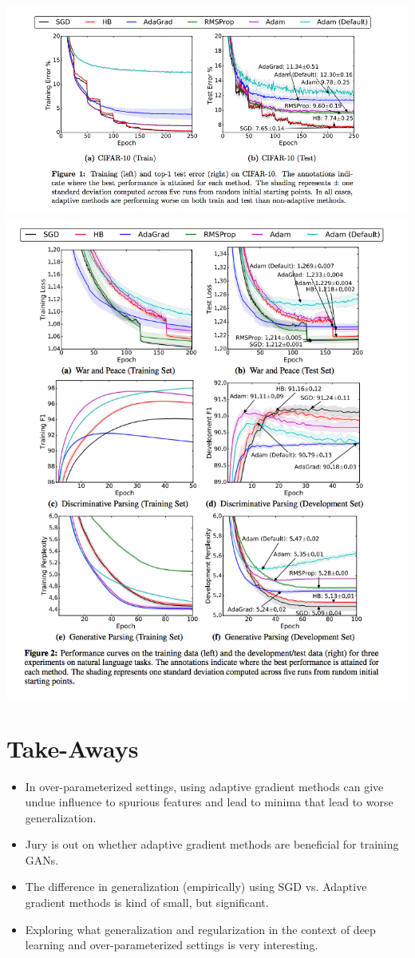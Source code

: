 \documentclass[12pt]{article}
\begin{document}
\includegraphics[width=1\textwidth]{generalization-curves}
\includegraphics[width=1\textwidth]{curves}

\newpage
\section{Take-Aways}

\begin{itemize}
	\item In over-parameterized settings, using adaptive gradient methods can give undue influence to spurious features and lead to minima that lead to worse generalization.
	\item Jury is out on whether adaptive gradient methods are beneficial for training GANs.
	\item The difference in generalization (empirically) using SGD vs. Adaptive gradient methods is kind of small, but significant.
	\item Exploring what generalization and regularization in the context of deep learning and over-parameterized settings is very interesting.
\end{itemize}



\end{document}
